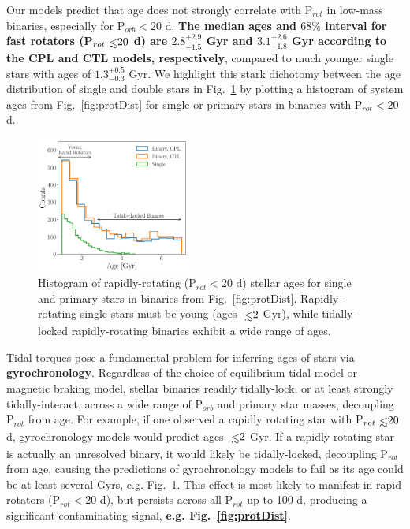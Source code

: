 \documentclass[twocolumn]{aastex61}
\def\lsim{~\rlap{$<$}{\lower 1.0ex\hbox{$\sim$}}}
\newcommand{\xxx}[1]{{\textbf{#1}}}
\begin{document}

Our models predict that age does not strongly correlate with P$_{rot}$ in low-mass binaries, especially for P$_{orb} < 20 $ d. \xxx{The median ages and $68\%$ interval for fast rotators (P$_{rot} \lsim 20$ d) are $2.8^{+2.9}_{-1.5}$ Gyr and $3.1^{+2.6}_{-1.8}$ Gyr according to the CPL and CTL models, respectively}, compared to much younger single stars with ages of $1.3^{+0.5}_{-0.3}$ Gyr. We highlight this stark dichotomy between the age distribution of single and double stars in Fig.~\ref{fig:protAgeHist} by plotting a histogram of system ages from Fig.~\ref{fig:protDist} for single or primary stars in binaries with P$_{rot} < 20$ d.  


\begin{figure}[h]
	\includegraphics[width=0.45\textwidth]{../Plots/protAgeHist.pdf}
   \caption{Histogram of rapidly-rotating (P$_{rot} < 20$ d) stellar ages for single and primary stars in binaries from Fig.~\ref{fig:protDist}. Rapidly-rotating single stars must be young (ages $\lsim 2$ Gyr), while tidally-locked rapidly-rotating binaries exhibit a wide range of ages.}%
    \label{fig:protAgeHist}%
\end{figure}

Tidal torques pose a fundamental problem for inferring ages of stars via \xxx{gyrochronology}. Regardless of the choice of equilibrium tidal model or magnetic braking model, stellar binaries readily tidally-lock, or at least strongly tidally-interact, across a wide range of P$_{orb}$ and primary star masses, decoupling P$_{rot}$ from age. For example, if one observed a rapidly rotating star with P$_{rot} \lsim 20$ d, gyrochronology models would predict ages $\lsim 2$ Gyr. If a rapidly-rotating star is actually an unresolved binary, it would likely be tidally-locked, decoupling P$_{rot}$ from age, causing the predictions of gyrochronology models to fail as its age could be at least several Gyrs, e.g. Fig.~\ref{fig:protAgeHist}. This effect is most likely to manifest in rapid rotators (P$_{rot} < 20$ d), but persists across all P$_{rot}$ up to 100 d, producing a significant contaminating signal, \textbf{e.g. Fig.~\ref{fig:protDist}}.
\end{document}
